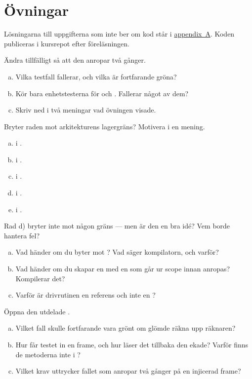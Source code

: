 \section*{Övningar}

Lösningarna till uppgifterna som inte ber om kod står i \hyperref[ch:losningar]{appendix~A}.
Koden publiceras i kursrepot efter föreläsningen.

\label{ex:7:1}
Ändra tillfälligt  så att den anropar  två gånger.
\begin{enumerate}[a)]
  \item Vilka testfall fallerar, och vilka är fortfarande gröna?
  \item Kör bara enhetstesterna för  och . Fallerar något av dem?
  \item Skriv ned i två meningar vad övningen visade.
\end{enumerate}

\label{ex:7:2}
Bryter raden mot arkitekturens lagergräns? Motivera i en mening.
\begin{enumerate}[a)]
  \item {} i .
  \item {} i .
  \item {} i .
  \item {} i .
  \item {} i .
\end{enumerate}
Rad d) bryter inte mot någon gräns --- men är den en bra idé? Vem borde hantera fel?

\label{ex:7:3}
\begin{enumerate}[a)]
  \item Vad händer om du byter  mot
    ? Vad säger kompilatorn, och varför?
  \item Vad händer om du skapar en  med en  som går ur scope innan
     anropas? Kompilerar det?
  \item Varför är drivrutinen en referens och inte en ?
\end{enumerate}

\label{ex:7:4}
Öppna den utdelade .
\begin{enumerate}[a)]
  \item Vilket fall skulle fortfarande vara grönt om  glömde räkna upp räknaren?
  \item Hur får testet in en frame, och hur läser det tillbaka den ekade? Varför finns de
    metoderna inte i ?
  \item Vilket krav uttrycker fallet som anropar  två gånger på en injicerad frame?
\end{enumerate}

